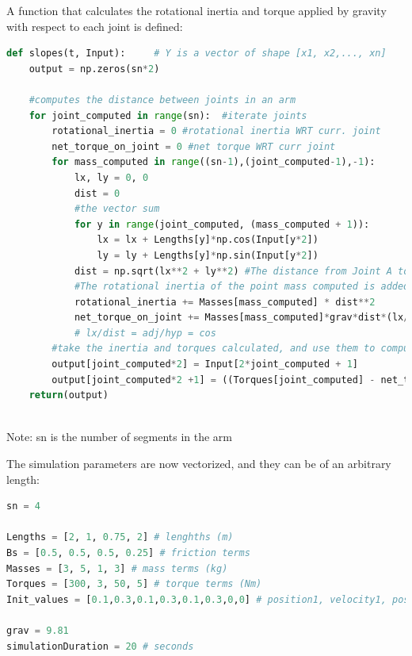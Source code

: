 \documentclass{article}
\begin{document}
\noindent \justifying A function that calculates the rotational inertia and torque applied by gravity with respect to each joint is defined:
\vspace{24pt}
\begin{lstlisting}[language=Python]
def slopes(t, Input):     # Y is a vector of shape [x1, x2,..., xn]
    output = np.zeros(sn*2)

    #computes the distance between joints in an arm
    for joint_computed in range(sn):  #iterate joints
        rotational_inertia = 0 #rotational inertia WRT curr. joint
        net_torque_on_joint = 0 #net torque WRT curr joint
        for mass_computed in range((sn-1),(joint_computed-1),-1):
            lx, ly = 0, 0
            dist = 0
            #the vector sum
            for y in range(joint_computed, (mass_computed + 1)):
                lx = lx + Lengths[y]*np.cos(Input[y*2])
                ly = ly + Lengths[y]*np.sin(Input[y*2])
            dist = np.sqrt(lx**2 + ly**2) #The distance from Joint A to B   
            #The rotational inertia of the point mass computed is added to the system:
            rotational_inertia += Masses[mass_computed] * dist**2 
            net_torque_on_joint += Masses[mass_computed]*grav*dist*(lx/dist) 
            # lx/dist = adj/hyp = cos
        #take the inertia and torques calculated, and use them to compute the ODE:
        output[joint_computed*2] = Input[2*joint_computed + 1]
        output[joint_computed*2 +1] = ((Torques[joint_computed] - net_torque_on_joint) / rotational_inertia)  - Bs[joint_computed]*Input[2*joint_computed + 1] #x2'
    return(output)
    
\end{lstlisting}
Note: sn is the number of segments in the arm

\newpage
\vspace{24pt}
\noindent \justifying The simulation parameters are now vectorized, and they can be of an arbitrary length:
\vspace{24pt}

\begin{lstlisting}[language=Python]
sn = 4

Lengths = [2, 1, 0.75, 2] # lenghths (m)
Bs = [0.5, 0.5, 0.5, 0.25] # friction terms 
Masses = [3, 5, 1, 3] # mass terms (kg)
Torques = [300, 3, 50, 5] # torque terms (Nm)
Init_values = [0.1,0.3,0.1,0.3,0.1,0.3,0,0] # position1, velocity1, position2, velocity2, ....., positionn, velocityn

grav = 9.81
simulationDuration = 20 # seconds
\end{lstlisting}
\end{document}
